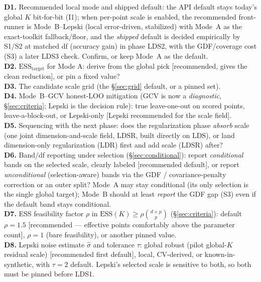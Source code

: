 \documentclass[11pt]{article}
\begin{document}
\begin{decide}
\textbf{D1.} Recommended local mode and shipped default: the API default stays today's
global $K$ bit-for-bit (I1); when per-point scale is enabled, the recommended front-runner
is Mode~B--Lepski (local error-driven, stabilized) with Mode~A as the exact-toolkit
fallback/floor, and the \emph{shipped} default is decided empirically by S1/S2 at matched
df (accuracy gain) in phase LDS2, with the GDF/coverage cost (S3) a later LDS3 check.
Confirm, or keep Mode~A as the default.\\
\textbf{D2.} $\mathrm{ESS}_{\text{target}}$ for Mode A: derive from the global pick
[recommended, gives the clean reduction], or pin a fixed value?\\
\textbf{D3.} The candidate scale grid (the \S\ref{sec:grid} default, or a pinned set).\\
\textbf{D4.} Mode~B--GCV honest-LOO mitigation (GCV is now a \emph{diagnostic},
\S\ref{sec:criteria}; Lepski is the decision rule): true leave-one-out on scored points,
leave-a-block-out, or Lepski-only [Lepski recommended for the scale field].\\
\textbf{D5.} Sequencing with the next phase: does the regularization phase
\emph{absorb} scale (one joint dimension-and-scale field, LDSR, built directly on
LDS), or land dimension-only regularization (LDR) first and add scale (LDSR) after?\\
\textbf{D6.} Band/df reporting under selection (\S\ref{sec:conditional}): report
\emph{conditional} bands on the selected scale, clearly labeled [recommended default],
or report \emph{unconditional} (selection-aware) bands via the GDF / covariance-penalty
correction or an outer split? Mode~A may stay conditional (its only selection is the
single global target); Mode~B should at least \emph{report} the GDF gap (S3) even if the
default band stays conditional.\\
\textbf{D7.} ESS feasibility factor $\rho$ in $\mathrm{ESS}(K)\ge\rho\binom{d+p}{p}$
(\S\ref{sec:criteria}): default $\rho=1.5$ [recommended --- effective points comfortably
above the parameter count], $\rho=1$ (bare feasibility), or another pinned value.\\
\textbf{D8.} Lepski noise estimate $\hat\sigma$ and tolerance $\tau$: global robust (pilot
global-$K$ residual scale) [recommended first default], local, CV-derived, or
known-in-synthetic, with $\tau=2$ default. Lepski's selected scale is sensitive to both, so
both must be pinned before LDS1.
\end{decide}
\end{document}
